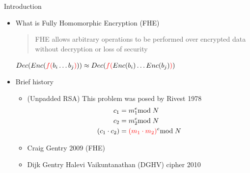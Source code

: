 \documentclass[dvips,11pt]{beamer}
\begin{document}
\begin{frame}{Introduction}
  
  \begin{itemize}
  \item What is Fully Homomorphic Encryption (FHE)

    \begin{quote}
      FHE allows arbitrary operations to be performed over encrypted data without decryption or loss of security
    \end{quote}    
      \(
      Dec(Enc(\textcolor{red}{f(}b_i\dots b_j\textcolor{red}{)}))
      \approx
      Dec(\textcolor{red}{f(}Enc(b_i)\dots Enc(b_j)\textcolor{red}{)})
      \)
      \vspace{1em}
    \item Brief history
      \begin{itemize}
        \item (Unpadded RSA) This problem was posed by Rivest 1978
          \begin{align*}
            c_1 &= m_1^e \text{mod}\;N\\
            c_2 &= m_2^e \text{mod}\;N\\
            (c_1\cdot c_2) &= \textcolor{red}{(m_1\cdot m_2)}^e\text{mod}\;N
          \end{align*}
        \item Craig Gentry 2009 (FHE)
        \item Dijk Gentry Halevi Vaikuntanathan (DGHV) cipher 2010
      \end{itemize}

  \end{itemize}
  
\end{frame}
\end{document}
